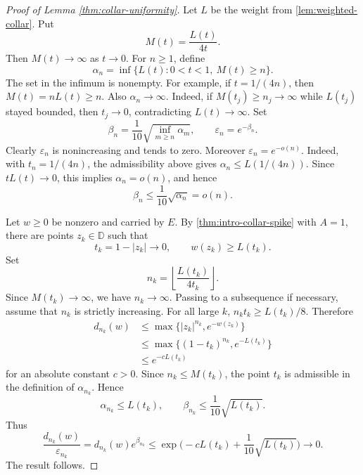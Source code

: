 \documentclass[11pt]{amsart}
\numberwithin{equation}{section}
\theoremstyle{definition}
\newcommand{\D}{\mathbb D}
\newcommand{\eps}{\varepsilon}
\begin{document}
\begin{proof}[Proof of Lemma \ref{thm:collar-uniformity}]
Let $L$ be the weight from \cref{lem:weighted-collar}.  Put
$$
        M(t)=\frac{L(t)}{4t}.
$$
Then $M(t)\to\infty$ as $t\to 0$.  For $n\ge1$, define
$$
        \alpha_n=\inf\{L(t):0<t<1,\ M(t)\ge n\}.
$$
The set in the infimum is nonempty. For example, if $t=1/(4n)$, then
$M(t)=nL(t)\ge n$.  
Also $\alpha_n\to\infty$.  Indeed, if
$M(t_j)\ge n_j\to\infty$ while $L(t_j)$ stayed bounded, then
$t_j\to0$, contradicting $L(t)\to\infty$.
Set
$$
        \beta_n=\frac1{10}\sqrt{\inf_{m\geq n}\alpha_m},
        \qquad
        \eps_n=e^{-\beta_n}.
$$
Clearly $\eps_n$ is
nonincreasing and tends to zero.  Moreover $\eps_n=e^{-o(n)}$.  Indeed,
with $t_n=1/(4n)$, the admissibility above gives
$
        \alpha_n\le L(1/(4n)).
$
Since $tL(t)\to0$, this implies $\alpha_n=o(n)$, and hence
$$
        \beta_n\le \frac1{10}\sqrt{\alpha_n}=o(n).
$$

Let $w\ge0$ be nonzero and carried by $E$.  By
\cref{thm:intro-collar-spike} with $A=1$, there are points $z_k\in\D$ such that
$$
        t_k=1-|z_k|\to0,
        \qquad
        w(z_k)\ge L(t_k).
$$
Set
$$
        n_k=\left\lfloor\frac{L(t_k)}{4t_k}\right\rfloor.
$$
Since $M(t_k)\to\infty$, we have $n_k\to\infty$.  Passing to a subsequence
if necessary, assume that $n_k$ is strictly increasing.  For all large $k$,
$
        n_k t_k\geq L(t_k)/8.
$
Therefore
$$
\begin{aligned}
        d_{n_k}(w)
        &\le \max\{|z_k|^{n_k},e^{-w(z_k)}\} \\
        &\le \max\{(1-t_k)^{n_k},e^{-L(t_k)}\} \\
        &\le e^{-cL(t_k)}
\end{aligned}
$$
for an absolute constant $c>0$.  Since $n_k\le M(t_k)$, the point $t_k$
is admissible in the definition of $\alpha_{n_k}$.  Hence
$$
        \alpha_{n_k}\le L(t_k),
        \qquad
        \beta_{n_k}\le \frac1{10}\sqrt{L(t_k)}.
$$
Thus
$$
        \frac{d_{n_k}(w)}{\eps_{n_k}}
        =d_{n_k}(w)e^{\beta_{n_k}}
        \le
        \exp\big(-cL(t_k)+\frac1{10}\sqrt{L(t_k)}\big)
        \longrightarrow0.
$$
The result follows.
\end{proof}
\end{document}
